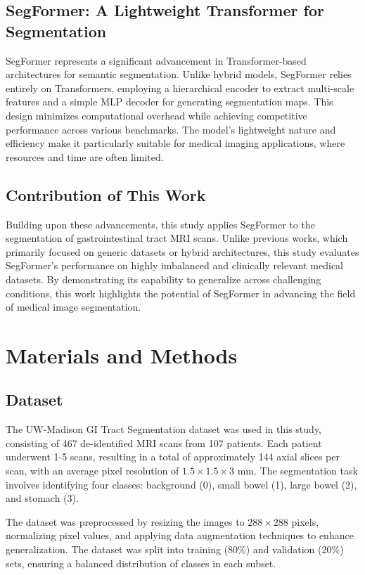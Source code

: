 \documentclass[journal]{IEEEtran}
\begin{document}
\subsection{SegFormer: A Lightweight Transformer for Segmentation}

SegFormer\cite{xie2021segformer} represents a significant advancement in Transformer-based architectures for semantic segmentation. Unlike hybrid models, SegFormer relies entirely on Transformers, employing a hierarchical encoder to extract multi-scale features and a simple MLP decoder for generating segmentation maps. This design minimizes computational overhead while achieving competitive performance across various benchmarks. The model's lightweight nature and efficiency make it particularly suitable for medical imaging applications, where resources and time are often limited.

\subsection{Contribution of This Work}

Building upon these advancements, this study applies SegFormer to the segmentation of gastrointestinal tract MRI scans. Unlike previous works, which primarily focused on generic datasets or hybrid architectures, this study evaluates SegFormer's performance on highly imbalanced and clinically relevant medical datasets. By demonstrating its capability to generalize across challenging conditions, this work highlights the potential of SegFormer in advancing the field of medical image segmentation.

\section{Materials and Methods}

\subsection{Dataset}

The UW-Madison GI Tract Segmentation dataset was used in this study, consisting of 467 de-identified MRI scans from 107 patients. Each patient underwent 1-5 scans, resulting in a total of approximately 144 axial slices per scan, with an average pixel resolution of \(1.5 \times 1.5 \times 3\) mm. The segmentation task involves identifying four classes: background (0), small bowel (1), large bowel (2), and stomach (3).

The dataset was preprocessed by resizing the images to \(288 \times 288\) pixels, normalizing pixel values, and applying data augmentation techniques to enhance generalization. The dataset was split into training (80\%) and validation (20\%) sets, ensuring a balanced distribution of classes in each subset.
\end{document}
